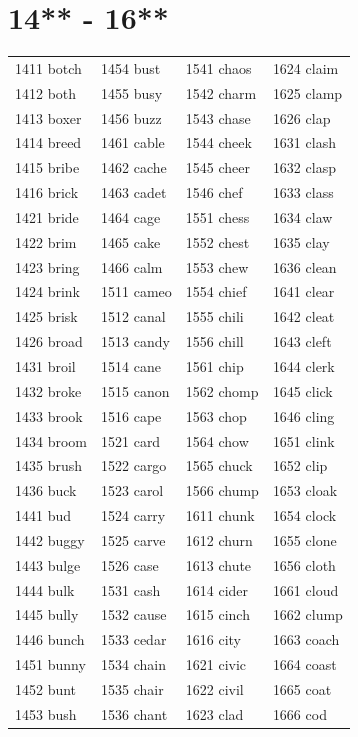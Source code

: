 \documentclass[12pt, oneside]{book}
\begin{document}
	\begin{table}[h]
		\centering
		\section*{14** - 16**}
		\begin{tabular}{l l l l}
			1411 botch & 1454 bust & 1541 chaos & 1624 claim\\
			1412 both & 1455 busy & 1542 charm & 1625 clamp\\
			1413 boxer & 1456 buzz & 1543 chase & 1626 clap\\
			1414 breed & 1461 cable & 1544 cheek & 1631 clash\\
			1415 bribe & 1462 cache & 1545 cheer & 1632 clasp\\
			1416 brick & 1463 cadet & 1546 chef & 1633 class\\
			1421 bride & 1464 cage & 1551 chess & 1634 claw\\
			1422 brim & 1465 cake & 1552 chest & 1635 clay\\
			1423 bring & 1466 calm & 1553 chew & 1636 clean\\
			1424 brink & 1511 cameo & 1554 chief & 1641 clear\\
			1425 brisk & 1512 canal & 1555 chili & 1642 cleat\\
			1426 broad & 1513 candy & 1556 chill & 1643 cleft\\
			1431 broil & 1514 cane & 1561 chip & 1644 clerk\\
			1432 broke & 1515 canon & 1562 chomp & 1645 click\\
			1433 brook & 1516 cape & 1563 chop & 1646 cling\\
			1434 broom & 1521 card & 1564 chow & 1651 clink\\
			1435 brush & 1522 cargo & 1565 chuck & 1652 clip\\
			1436 buck & 1523 carol & 1566 chump & 1653 cloak\\
			1441 bud & 1524 carry & 1611 chunk & 1654 clock\\
			1442 buggy & 1525 carve & 1612 churn & 1655 clone\\
			1443 bulge & 1526 case & 1613 chute & 1656 cloth\\
			1444 bulk & 1531 cash & 1614 cider & 1661 cloud\\
			1445 bully & 1532 cause & 1615 cinch & 1662 clump\\
			1446 bunch & 1533 cedar & 1616 city & 1663 coach\\
			1451 bunny & 1534 chain & 1621 civic & 1664 coast\\
			1452 bunt & 1535 chair & 1622 civil & 1665 coat\\
			1453 bush & 1536 chant & 1623 clad & 1666 cod\\
		\end{tabular}
	\end{table}
	
\end{document}
